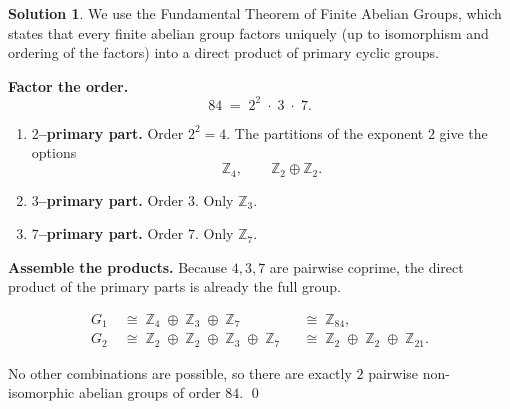 \documentclass[12pt]{article}
\theoremstyle{definition} %
\newtheorem{solution}{Solution}
\theoremstyle{plain} %
\begin{document}
            \begin{solution}
              We use the Fundamental Theorem of Finite Abelian Groups, which states  
              that every finite abelian group factors uniquely (up to isomorphism and
              ordering of the factors) into a direct product of primary cyclic groups.
              
              \medskip
              \textbf{Factor the order.}\;
              \[
                    84 \;=\; 2^{2}\;\cdot\;3\;\cdot\;7 .
              \]
              
              \begin{enumerate}[label=\textbf{\arabic*.},wide,labelwidth=0pt,labelsep=1em]
              
              \item \textbf{$2$–primary part.}\;
                    Order $2^{2}=4$.
                    The partitions of the exponent $2$ give the options  
                    \[
                         \mathbb{Z}_{4},
                         \qquad
                         \mathbb{Z}_{2}\oplus\mathbb{Z}_{2}.
                    \]
              
              \item \textbf{$3$–primary part.}\;
                    Order $3$.
                    Only \(\mathbb{Z}_{3}\).
              
              \item \textbf{$7$–primary part.}\;
                    Order $7$.
                    Only \(\mathbb{Z}_{7}\).
              \end{enumerate}
              
              \medskip
              \textbf{Assemble the products.}\;
              Because $4,3,7$ are pairwise coprime,
              the direct product of the primary parts is already the full group.
              
              \[
              \boxed{\;
              \begin{aligned}
                 G_{1} &\;\cong\;
                         \mathbb{Z}_{4}\;\oplus\;\mathbb{Z}_{3}\;\oplus\;\mathbb{Z}_{7}
                         &&\cong\;\mathbb{Z}_{84},
                 \\[4pt]
                 G_{2} &\;\cong\;
                         \mathbb{Z}_{2}\;\oplus\;\mathbb{Z}_{2}\;\oplus\;\mathbb{Z}_{3}\;\oplus\;\mathbb{Z}_{7}
                         &&\cong\;\mathbb{Z}_{2}\;\oplus\;\mathbb{Z}_{2}\;\oplus\;\mathbb{Z}_{21}.
              \end{aligned}
              \;}
              \]
              
              \smallskip
              No other combinations are possible, so there are exactly
              \(\boxed{2}\) pairwise non-isomorphic abelian groups of order $84$.
              \qed
              \end{solution}
\end{document}
